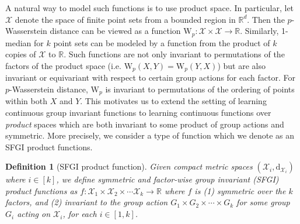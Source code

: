 \documentclass[12pt]{article}
\newcommand{\R}{\mathbb R}
\newtheorem{definition}[theorem]{Definition}
\newcommand{\SFGI} {{SFGI}}
\begin{document}
A natural way to model such functions is to use product space.
In particular, let $\mathcal{X}$ denote the space of finite point sets from a bounded region in $\mathbb{R}^d$. 
Then the $p$-Wasserstein distance can be viewed as a function $\mathrm{W}_p: \mathcal{X} \times \mathcal{X} \to \mathbb{R}$. 
Similarly, 1-median for $k$ point sets can be modeled by a function from the product of $k$ copies of $\mathcal{X}$ to $\R$. 
Such functions are not only invariant to permutations of the factors of the product space (i.e. $\mathrm{W}_p(X, Y) = \mathrm{W}_p(Y, X)$) but are also invariant or equivariant with respect to certain group actions for each factor. 
For $p$-Wasserstein distance, $\mathrm{W}_p$ is invariant to permutations of the ordering of points within both $X$ and $Y$.
This motivates us to extend the setting of learning continuous group invariant functions to learning continuous functions over \textit{product} spaces which are both  invariant to some product of group actions and symmetric. 
More precisely, we consider a type of function which we denote as an \SFGI{} product functions. 
\begin{definition}[SFGI product function]\label{def:SFGI}
Given compact metric spaces $(\mathcal{X}_i, \mathrm{d}_{\mathcal{X}_i})$ where $i \in [k]$,  we define \textit{symmetric and factor-wise group invariant} (\SFGI) product functions as $f: \mathcal{X}_1 \times \mathcal{X}_2 \times \cdots \mathcal{X}_k \to \R$ where $f$ is (1) symmetric over the $k$ factors, and (2) invariant to the group action $G_1 \times G_2 \times \cdots \times G_k$ for some group $G_i$ acting on $\mathcal{X}_i$, for each $i\in [1, k]$.
\end{definition} 
\end{document}
